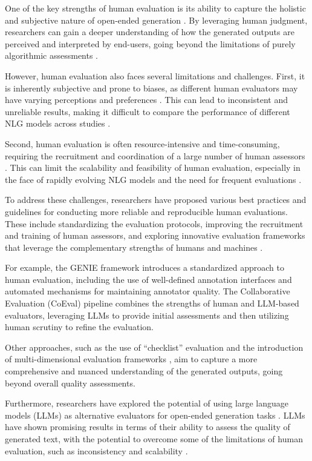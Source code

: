 \documentclass[11pt]{article}
\begin{document}
One of the key strengths of human evaluation is its ability to capture the holistic and subjective nature of open-ended generation \cite{ref95}. By leveraging human judgment, researchers can gain a deeper understanding of how the generated outputs are perceived and interpreted by end-users, going beyond the limitations of purely algorithmic assessments \cite{ref96}.

However, human evaluation also faces several limitations and challenges. First, it is inherently subjective and prone to biases, as different human evaluators may have varying perceptions and preferences \cite{ref97}. This can lead to inconsistent and unreliable results, making it difficult to compare the performance of different NLG models across studies \cite{ref98}.

Second, human evaluation is often resource-intensive and time-consuming, requiring the recruitment and coordination of a large number of human assessors \cite{ref91}. This can limit the scalability and feasibility of human evaluation, especially in the face of rapidly evolving NLG models and the need for frequent evaluations \cite{ref99}.

To address these challenges, researchers have proposed various best practices and guidelines for conducting more reliable and reproducible human evaluations. These include standardizing the evaluation protocols, improving the recruitment and training of human assessors, and exploring innovative evaluation frameworks that leverage the complementary strengths of humans and machines \cite{ref100,ref66}.

For example, the GENIE framework \cite{ref100} introduces a standardized approach to human evaluation, including the use of well-defined annotation interfaces and automated mechanisms for maintaining annotator quality. The Collaborative Evaluation (CoEval) pipeline \cite{ref66} combines the strengths of human and LLM-based evaluators, leveraging LLMs to provide initial assessments and then utilizing human scrutiny to refine the evaluation.

Other approaches, such as the use of ``checklist'' evaluation \cite{ref101} and the introduction of multi-dimensional evaluation frameworks \cite{ref102}, aim to capture a more comprehensive and nuanced understanding of the generated outputs, going beyond overall quality assessments.

Furthermore, researchers have explored the potential of using large language models (LLMs) as alternative evaluators for open-ended generation tasks \cite{ref103,ref104}. LLMs have shown promising results in terms of their ability to assess the quality of generated text, with the potential to overcome some of the limitations of human evaluation, such as inconsistency and scalability \cite{ref105}.
\end{document}
